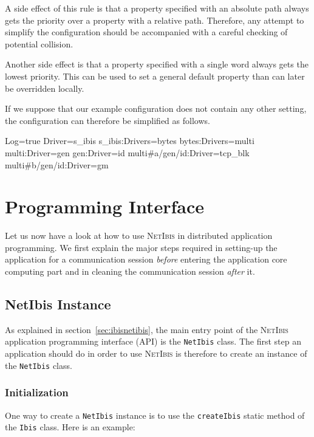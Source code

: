 \documentclass[11pt]{book}
\def\NetIbis{\textsc{NetIbis}\xspace}
\def\netibis{\texttt{NetIbis}\xspace}
\begin{document}
A side effect of this rule is that a property specified with an
absolute path always gets the priority over a property with a relative
path. Therefore, any attempt to simplify the configuration should be
accompanied with a careful checking of potential collision.

Another side effect is that a property specified with a single word
always gets the lowest priority. This can be used to set a general
default property than can later be overridden locally.

If we suppose that our example configuration does not contain any
other setting, the configuration can therefore be simplified as
follows.
\begin{Miniverb}

  Log=true
  Driver=s_ibis
  s_ibis:Drivers=bytes
  bytes:Drivers=multi
  multi:Driver=gen
  gen:Driver=id
  multi#a/gen/id:Driver=tcp_blk
  multi#b/gen/id:Driver=gm

\end{Miniverb}

\section{Programming Interface}
\label{sec:progr-interf}
Let us now have a look at how to use \NetIbis in distributed
application programming. We first explain the major steps required in
setting-up the application for a communication session \emph{before}
entering the application core computing part and in cleaning the
communication session \emph{after} it.

\subsection{NetIbis Instance}
\label{sec:netibis-instance}

As explained in section~\ref{sec:ibisnetibis}, the main entry point of
the \NetIbis application programming interface (API) is the \netibis
class. The first step an application should do in order to use
\NetIbis is therefore to create an instance of the \netibis class.

%
\subsubsection{Initialization}
\label{sec:initialization}

One way to create a \netibis instance is to use the
\texttt{createIbis} static method of the \texttt{Ibis} class. Here is
an example:
\end{document}
